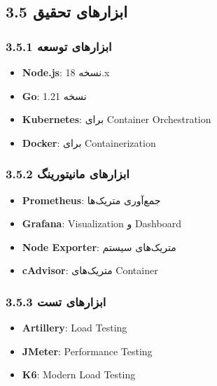 \documentclass[
]{article}
\providecommand{\tightlist}{%
  \setlength{\itemsep}{0pt}\setlength{\parskip}{0pt}}
\begin{document}
\subsection{3.5 ابزارهای
تحقیق}\label{ux627ux628ux632ux627ux631ux647ux627ux6cc-ux62aux62dux642ux6ccux642}

\subsubsection{3.5.1 ابزارهای
توسعه}\label{ux627ux628ux632ux627ux631ux647ux627ux6cc-ux62aux648ux633ux639ux647}

\begin{itemize}
\tightlist
\item
  \textbf{Node.js}: نسخه 18.x
\item
  \textbf{Go}: نسخه 1.21
\item
  \textbf{Kubernetes}: برای Container Orchestration
\item
  \textbf{Docker}: برای Containerization
\end{itemize}

\subsubsection{3.5.2 ابزارهای
مانیتورینگ}\label{ux627ux628ux632ux627ux631ux647ux627ux6cc-ux645ux627ux646ux6ccux62aux648ux631ux6ccux646ux6af}

\begin{itemize}
\tightlist
\item
  \textbf{Prometheus}: جمع‌آوری متریک‌ها
\item
  \textbf{Grafana}: Visualization و Dashboard
\item
  \textbf{Node Exporter}: متریک‌های سیستم
\item
  \textbf{cAdvisor}: متریک‌های Container
\end{itemize}

\subsubsection{3.5.3 ابزارهای
تست}\label{ux627ux628ux632ux627ux631ux647ux627ux6cc-ux62aux633ux62a}

\begin{itemize}
\tightlist
\item
  \textbf{Artillery}: Load Testing
\item
  \textbf{JMeter}: Performance Testing
\item
  \textbf{K6}: Modern Load Testing
\end{itemize}
\end{document}
